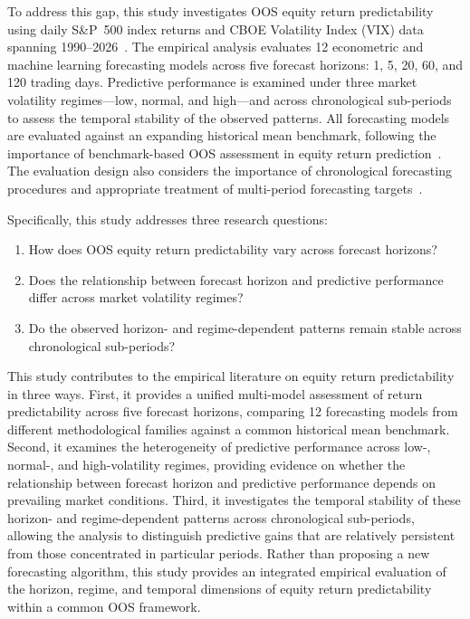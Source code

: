 \documentclass[runningheads,orivec]{llncs}
\begin{document}
To address this gap, this study investigates OOS equity return predictability using daily S\&P~500 index returns and CBOE Volatility Index (VIX) data spanning 1990--2026~\cite{fredvix,yahoosandp}. The empirical analysis evaluates 12 econometric and machine learning forecasting models across five forecast horizons: 1, 5, 20, 60, and 120 trading days. Predictive performance is examined under three market volatility regimes---low, normal, and high---and across chronological sub-periods to assess the temporal stability of the observed patterns. All forecasting models are evaluated against an expanding historical mean benchmark, following the importance of benchmark-based OOS assessment in equity return prediction~\cite{campbell2008}. The evaluation design also considers the importance of chronological forecasting procedures and appropriate treatment of multi-period forecasting targets~\cite{hewamalage2023,tashman2000}.

Specifically, this study addresses three research questions:
\begin{enumerate}
\item How does OOS equity return predictability vary across forecast horizons?
\item Does the relationship between forecast horizon and predictive performance differ across market volatility regimes?
\item Do the observed horizon- and regime-dependent patterns remain stable across chronological sub-periods?
\end{enumerate}

This study contributes to the empirical literature on equity return predictability in three ways. First, it provides a unified multi-model assessment of return predictability across five forecast horizons, comparing 12 forecasting models from different methodological families against a common historical mean benchmark. Second, it examines the heterogeneity of predictive performance across low-, normal-, and high-volatility regimes, providing evidence on whether the relationship between forecast horizon and predictive performance depends on prevailing market conditions. Third, it investigates the temporal stability of these horizon- and regime-dependent patterns across chronological sub-periods, allowing the analysis to distinguish predictive gains that are relatively persistent from those concentrated in particular periods. Rather than proposing a new forecasting algorithm, this study provides an integrated empirical evaluation of the horizon, regime, and temporal dimensions of equity return predictability within a common OOS framework.
\end{document}
